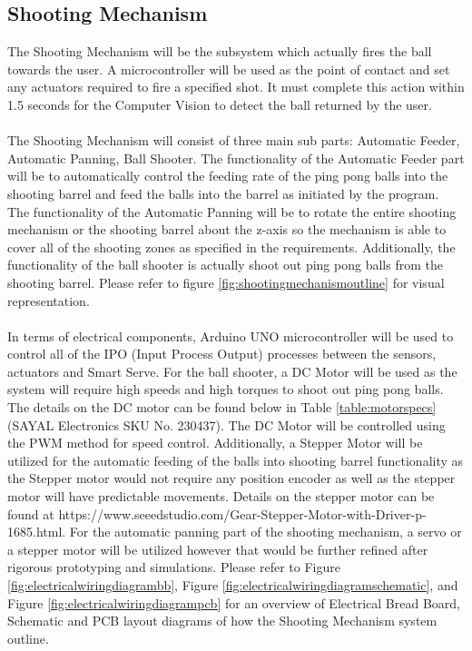 \documentclass[11pt]{article}
\begin{document}
\subsection{Shooting Mechanism}
The Shooting Mechanism will be the subsystem which actually fires the ball towards the user. A microcontroller will be used as the point of contact and set any actuators required to fire a specified shot. It must complete this action within 1.5 seconds for the Computer Vision to detect the ball returned by the user. \\\\
The Shooting Mechanism will consist of three main sub parts: Automatic Feeder, Automatic Panning, Ball Shooter. The functionality of the Automatic Feeder part will be to automatically control the feeding rate of the ping pong balls into the shooting barrel and feed the balls into the barrel as initiated by the program. The functionality of the Automatic Panning will be to rotate the entire shooting mechanism or the shooting barrel about the z-axis so the mechanism is able to cover all of the shooting zones as specified in the requirements. Additionally, the functionality of the ball shooter is actually shoot out ping pong balls from the shooting barrel. Please refer to figure \ref{fig:shootingmechanismoutline} for visual representation. \\\\
In terms of electrical components, Arduino UNO microcontroller will be used to control all of the IPO (Input Process Output) processes between the sensors, actuators and Smart Serve. For the ball shooter, a DC Motor will be used as the system will require high speeds and high torques to shoot out ping pong balls. The details on the DC motor can be found below in Table \ref{table:motorspecs} (SAYAL Electronics SKU No. 230437). The DC Motor will be controlled using the PWM method for speed control. Additionally, a Stepper Motor will be utilized for the automatic feeding of the balls into shooting barrel functionality as the Stepper motor would not require any position encoder as well as the stepper motor will have predictable movements. Details on the stepper motor can be found at https://www.seeedstudio.com/Gear-Stepper-Motor-with-Driver-p-1685.html. For the automatic panning part of the shooting mechanism, a servo or a stepper motor will be utilized however that would be further refined after rigorous prototyping and simulations. Please refer to Figure \ref{fig:electricalwiringdiagrambb}, Figure \ref{fig:electricalwiringdiagramschematic}, and Figure \ref{fig:electricalwiringdiagrampcb} for an overview of Electrical Bread Board, Schematic and PCB layout diagrams of how the Shooting Mechanism system outline.
\end{document}
